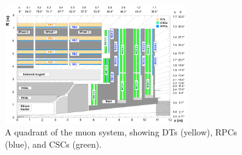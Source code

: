 	\begin{figure}[H]
		\centering
		\includegraphics[width=0.7\textwidth]{fig/chapt2/Muon_quadrant.png}
		\caption{\label{fig:Quadrant} A quadrant of the muon system, showing DTs (yellow), RPCs (blue), and CSCs (green).}
	\end{figure}

\clearpage{\pagestyle{empty}\cleardoublepage}